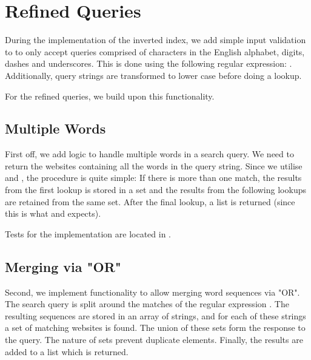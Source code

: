 \section{Refined Queries}

During the implementation of the inverted index, we add simple input validation to  to only accept queries comprised of characters in the English alphabet, digits, dashes and underscores. This is done using the following regular expression: \code{\\\\b([-\\\\w]+)\\\\b}. Additionally, query strings are transformed to lower case before doing a lookup.

For the refined queries, we build upon this functionality.

\subsection{Multiple Words}
First off, we add logic to handle multiple words in a search query. We need to return the websites containing all the words in the query string. Since we utilise  and , the procedure is quite simple: If there is more than one match, the results from the first lookup is stored in a set and the results from the following lookups are retained from the same set. After the final lookup, a list is returned (since this is what  and  expects).

Tests for the implementation are located in .

\subsection{Merging via "OR"}
Second, we implement functionality to allow merging word sequences via "OR". The search query is split around the matches of the regular expression \code{\\\\bOR\\\\b}. The resulting sequences are stored in an array of strings, and for each of these strings a set of matching websites is found. The union of these sets form the response to the query. The nature of sets prevent duplicate elements. Finally, the results are added to a list which is returned.

